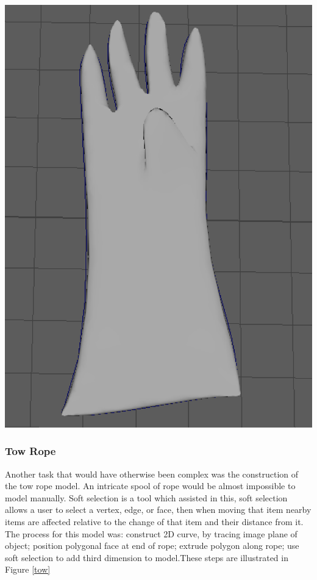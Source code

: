 \documentclass[a4paper, openright, twoside]{book}
\begin{document}
\begin{minipage}{\textwidth}
\begin{center}
\begin{minipage}{0.18\textwidth}
    \end{minipage}\hfill
    \begin{minipage}{0.18\textwidth}
        \centering
        \includegraphics[width=1\textwidth]{images/adddivision.png}
    \end{minipage}\hfill
\end{center}
\end{minipage}

\subsubsection{Tow Rope}
Another task that would have otherwise been complex was the construction of the tow rope model. An intricate spool of rope would be almost impossible to model manually. Soft selection is a tool which assisted in this, soft selection allows a user to select a vertex, edge, or face, then when moving that item nearby items are affected relative to the change of that item and their distance from it. The process for this model was: construct 2D curve, by tracing image plane of object; position polygonal face at end of rope; extrude polygon along rope; use soft selection to add third dimension to model.These steps are illustrated in Figure \ref{tow}
\end{document}
